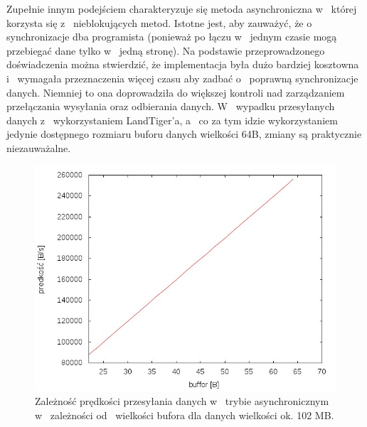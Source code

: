 \documentclass{BscUS}
\begin{document}
\newline
\indent Zupełnie innym podejściem charakteryzuje się metoda asynchroniczna w~ której korzysta się z~ nieblokujących metod. Istotne jest, aby zauważyć, że o~ synchronizacje dba programista (ponieważ po łączu w~ jednym czasie mogą przebiegać dane tylko w~ jedną stronę). Na podstawie przeprowadzonego doświadczenia można stwierdzić, że implementacja była dużo bardziej kosztowna i~ wymagała przeznaczenia więcej czasu aby zadbać o~ poprawną synchronizacje danych. Niemniej to ona doprowadziła do większej kontroli nad zarządzaniem przełączania wysyłania oraz odbierania danych. W~ wypadku przesyłanych danych z~ wykorzystaniem LandTiger'a, a~ co za tym idzie wykorzystaniem jedynie dostępnego rozmiaru buforu danych wielkości 64B, zmiany są praktycznie niezauważalne. 
\begin{figure}[H]
{
\centering
\captionsetup{justification=centering}
\includegraphics[width=1\textwidth]{./img/A_107374200Receive}
\caption{Zależność prędkości przesyłania danych w~ trybie asynchronicznym w~ zależności od~ wielkości bufora dla danych wielkości ok. 102 MB.}
\label{fig:A_107374200Receive}
}

\end{figure}
\end{document}
